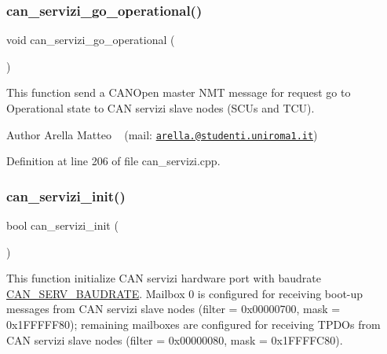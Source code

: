 \subsubsection{\texorpdfstring{can\+\_\+servizi\+\_\+go\+\_\+operational()}{can\_servizi\_go\_operational()}}
{\footnotesize\ttfamily void can\+\_\+servizi\+\_\+go\+\_\+operational (\begin{DoxyParamCaption}{ }\end{DoxyParamCaption})}



This function send a C\+A\+N\+Open master N\+MT message for request \textquotesingle{}go to Operational\textquotesingle{} state to C\+AN servizi slave nodes (S\+C\+Us and T\+CU). 

\begin{DoxyAuthor}{Author}
Arella Matteo ~\newline
 (mail\+: \href{mailto:arella.1646983@studenti.uniroma1.it}{\tt arella.@studenti.\+uniroma1.\+it}) 
\end{DoxyAuthor}


Definition at line 206 of file can\+\_\+servizi.\+cpp.

\mbox{\label{group___c_a_n__servizi__group_ga2d29bd107e96ae1986e8874f004ffc84}} 
\subsubsection{\texorpdfstring{can\+\_\+servizi\+\_\+init()}{can\_servizi\_init()}}
{\footnotesize\ttfamily bool can\+\_\+servizi\+\_\+init (\begin{DoxyParamCaption}{ }\end{DoxyParamCaption})}



This function initialize C\+AN servizi hardware port with baudrate \mbox{\hyperlink{common_8h_a2a5e84dfc7fa972b75e7ddbc6cc52a45}{C\+A\+N\+\_\+\+S\+E\+R\+V\+\_\+\+B\+A\+U\+D\+R\+A\+TE}}. Mailbox 0 is configured for receiving boot-\/up messages from C\+AN servizi slave nodes (filter = 0x00000700, mask = 0x1\+F\+F\+F\+F\+F80); remaining mailboxes are configured for receiving T\+P\+D\+Os from C\+AN servizi slave nodes (filter = 0x00000080, mask = 0x1\+F\+F\+F\+F\+C80). 

